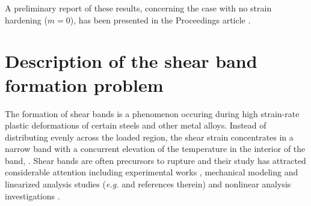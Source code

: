\documentclass[usletter,11pt]{article}
\theoremstyle{remark}
\begin{document}



A preliminary report of these results, concerning the case with no strain hardening ($m = 0$), has been presented in the 
Proceedings article \cite{KLT_HYP2016}. 


\section{Description of the shear band formation problem}
\label{mathmodel}

The formation of shear bands \cite{CCHD,ZH}  is a phenomenon occuring during
high strain-rate plastic deformations of certain steels and other metal alloys. Instead of distributing evenly across the loaded region, 
the shear strain concentrates in a narrow band with a concurrent elevation of the temperature in the interior of the band, \cite{ZH,CCHD,HDH}.
Shear bands are often precursors to rupture and their study has attracted considerable
attention including  experimental works  \cite{CCHD,HDH}, mechanical modeling 
and  linearized analysis studies  ({\it e.g.} \cite{CDHS,FM,MC,wright_survey_2002} and references therein) and
nonlinear analysis investigations  \cite{DH_1983,Tz_1987,bertsch_effect_1991}.
\end{document}
